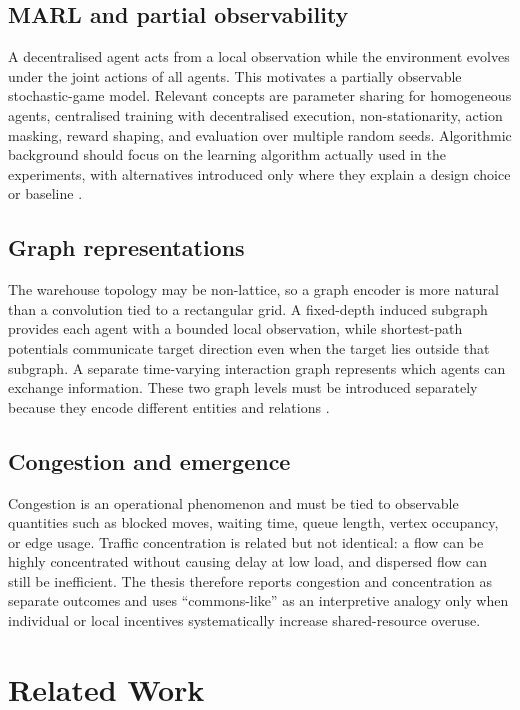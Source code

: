 \documentclass[../main.tex]{subfiles}
\begin{document}
\subsection{MARL and partial observability}

A decentralised agent acts from a local observation while the environment
evolves under the joint actions of all agents. This motivates a partially
observable stochastic-game model. Relevant concepts are parameter sharing for
homogeneous agents, centralised training with decentralised execution,
non-stationarity, action masking, reward shaping, and evaluation over multiple
random seeds. Algorithmic background should focus on the learning algorithm
actually used in the experiments, with alternatives introduced only where they
explain a design choice or baseline \cite{lau2022mapd}.

\subsection{Graph representations}

The warehouse topology may be non-lattice, so a graph encoder is more natural
than a convolution tied to a rectangular grid. A fixed-depth induced subgraph
provides each agent with a bounded local observation, while shortest-path
potentials communicate target direction even when the target lies outside that
subgraph. A separate time-varying interaction graph represents which agents
can exchange information. These two graph levels must be introduced separately
because they encode different entities and relations
\cite{vanknippenberg2021time,pham2024crowd}.

\subsection{Congestion and emergence}

Congestion is an operational phenomenon and must be tied to observable
quantities such as blocked moves, waiting time, queue length, vertex occupancy,
or edge usage. Traffic concentration is related but not identical: a flow can
be highly concentrated without causing delay at low load, and dispersed flow
can still be inefficient. The thesis therefore reports congestion and
concentration as separate outcomes and uses ``commons-like'' as an
interpretive analogy only when individual or local incentives systematically
increase shared-resource overuse.

\section{Related Work}
\label{sec:related-work}
\end{document}
